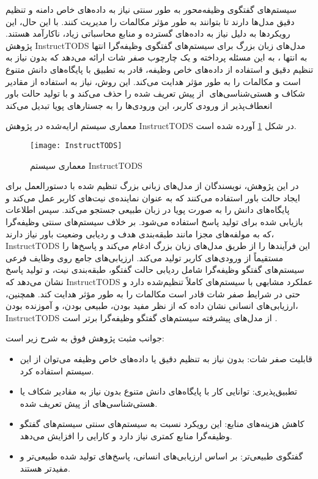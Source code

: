 سیستم‌های گفتگوی وظیفه‌محور به طور سنتی نیاز به داده‌های خاص دامنه و 
تنظیم دقیق مدل‌ها%
 دارند تا بتوانند به طور مؤثر مکالمات را مدیریت کنند. با این حال، این رویکردها به دلیل نیاز به داده‌های گسترده و منابع محاسباتی زیاد، ناکارآمد هستند. پژوهش InstructTODS مدل‌های زبان بزرگ برای سیستم‌های گفتگوی وظیفه‌گرا انتها به انتها
\cite{chung2023instructtods}
، به این مسئله پرداخته و یک چارچوب صفر شات ارائه می‌دهد که بدون نیاز به تنظیم دقیق و استفاده از داده‌های خاص وظیفه، قادر به تطبیق با پایگاه‌های دانش متنوع است و مکالمات را به طور مؤثر هدایت می‌کند. این روش، نیاز به استفاده از مقادیر شکاف و 
هستی‌شناسی‌های%
‌
 از پیش تعریف شده را حذف می‌کند و با تولید حالت باور انعطاف‌پذیر از ورودی کاربر، این ورودی‌ها را به جستارهای پویا تبدیل می‌کند%
\cite{madotto2021few}

معماری سیستم ارایه‌شده در پژوهش InstructTODS در شکل \ref{fig:InstructTODS} آورده شده است.

\begin{figure}[ht]
    \centerline{\texttt{[image: InstructTODS]}}
    \caption{معماری سیستم InstructTODS 
    \cite{chung2023instructtods}
    }
    \label{fig:InstructTODS}
\end{figure}


در این پژوهش، نویسندگان از مدل‌های زبانی بزرگ تنظیم شده با دستورالعمل برای ایجاد حالت باور استفاده می‌کنند که به عنوان نماینده‌ی نیت‌های کاربر عمل می‌کند و پایگاه‌های دانش را به صورت پویا در زبان طبیعی جستجو می‌کند. سپس اطلاعات بازیابی شده برای تولید پاسخ استفاده می‌شود. بر خلاف سیستم‌های سنتی وظیفه‌گرا که به مولفه‌های مجزا مانند طبقه‌بندی هدف و ردیابی وضعیت باور نیاز دارند، InstructTODS این فرآیندها را از طریق مدل‌های زبان بزرگ ادغام می‌کند و پاسخ‌ها را مستقیماً از ورودی‌های کاربر تولید می‌کند.
\newline
ارزیابی‌های جامع روی وظایف فرعی سیستم‌های گفتگو وظیفه‌گرا شامل ردیابی حالت گفتگو، طبقه‌بندی نیت، و تولید پاسخ نشان می‌دهد که InstructTODS عملکرد مشابهی با سیستم‌های 
کاملاً تنظیم‌شده%
 دارد و حتی در شرایط صفر شات قادر است مکالمات را به طور مؤثر هدایت کند. همچنین، ارزیابی‌های انسانی نشان داده که از نظر مفید بودن، طبیعی بودن، و آموزنده بودن، InstructTODS از مدل‌های پیشرفته سیستم‌های گفتگو وظیفه‌گرا برتر است%
\cite{madotto2021few}
.

جوانب مثبت پژوهش فوق به شرح زیر است:
\begin{itemize}
\item
قابلیت صفر شات: بدون نیاز به تنظیم دقیق یا داده‌های خاص وظیفه می‌توان از این سیستم استفاده کرد.
\item
تطبیق‌پذیری: توانایی کار با پایگاه‌های دانش متنوع بدون نیاز به مقادیر شکاف یا هستی‌شناسی‌های از پیش تعریف شده.
\item
کاهش هزینه‌های منابع: این رویکرد نسبت به سیستم‌های سنتی سیستم‌های گفتگو وظیفه‌گرا منابع کمتری نیاز دارد و کارایی را افزایش می‌دهد.
\item
گفتگوی طبیعی‌تر: بر اساس ارزیابی‌های انسانی، پاسخ‌های تولید شده طبیعی‌تر و مفیدتر هستند.
\end{itemize}

